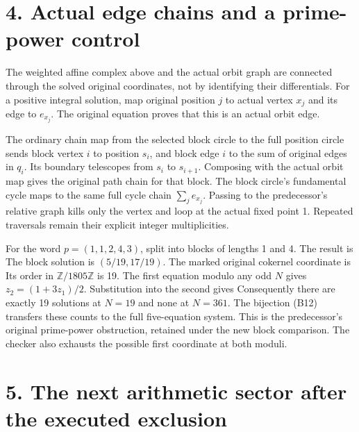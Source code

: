 \section{4. Actual edge chains and a prime-power control}

The weighted affine complex above and the actual orbit graph are
connected through the solved original coordinates, not by identifying
their differentials. For a positive integral solution, map original
position \(j\) to actual vertex \(x_j\) and its edge to \(e_{x_j}\). The
original equation proves that this is an actual orbit edge.

The ordinary chain map from the selected block circle to the full
position circle sends block vertex \(i\) to position \(s_i\), and block
edge \(i\) to the sum of original edges in \(q_i\). Its boundary
telescopes from \(s_i\) to \(s_{i+1}\). Composing with the actual orbit
map gives the original path chain for that block. The block circle's
fundamental cycle maps to the same full cycle chain \(\sum_j e_{x_j}\).
Passing to the predecessor's relative graph kills only the vertex and
loop at the actual fixed point 1. Repeated traversals remain their
explicit integer multiplicities.

For the word \(p=(1,1,2,4,3)\), split into blocks of lengths 1 and 4.
The result is
The block solution is \((5/19,17/19)\). The marked original cokernel
coordinate is
Its order in \(\mathbb Z/1805\mathbb Z\) is 19. The first equation
modulo any odd \(N\) gives \(z_2=(1+3z_1)/2\). Substitution into the
second gives  Consequently there are
exactly 19 solutions at \(N=19\) and none at \(N=361\). The bijection
(B12) transfers these counts to the full five-equation system. This is
the predecessor's original prime-power obstruction, retained under the
new block comparison. The checker also exhausts the possible first
coordinate at both moduli.

\section{5. The next arithmetic sector after the executed exclusion}

